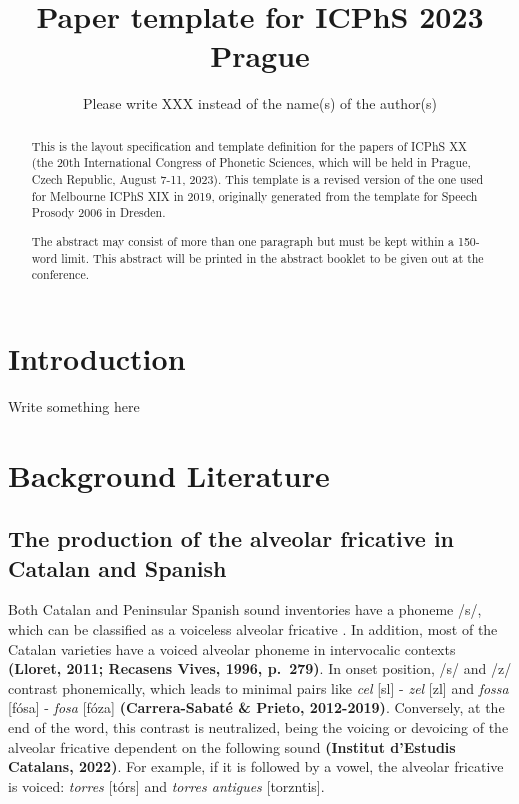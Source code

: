\documentclass[
  a4paper,
  11pt,
  twocolumn]{article}
\author{}
\date{\vspace{-2.5em}}
\begin{document}
\title{Paper template for {ICPhS} 2023 Prague}
\author{Please write XXX instead of the name(s) of the author(s)}


\maketitle

\begin{abstract}
This is the layout specification and template definition for the papers of ICPhS XX (the 20th International Congress of Phonetic Sciences, which will be held in Prague, Czech Republic, August 7-11, 2023). 
This template is a revised version of the one used for Melbourne ICPhS XIX in 2019, originally generated from the template for Speech Prosody 2006 in Dresden.

The abstract may consist of more than one paragraph but must be kept within a 150-word limit. 
This abstract will be printed in the abstract booklet to be given out at the conference.
\end{abstract}



\section{Introduction}

Write something here

\section{Background Literature}

\subsection{The production of the alveolar fricative in Catalan and Spanish}

Both Catalan and Peninsular Spanish sound inventories have a phoneme
/s/, which can be classified as a voiceless alveolar fricative
\cite{hualde_colina_2015}. In addition, most of the Catalan varieties
have a voiced alveolar phoneme in intervocalic contexts \textbf{(Lloret,
2011; Recasens Vives, 1996, p.~279)}. In onset position, /s/ and /z/
contrast phonemically, which leads to minimal pairs like \emph{cel}
{[}s\textepsilon l{]} - \emph{zel} {[}z\textepsilon l{]} and
\emph{fossa} {[}fósa{]} - \emph{fosa} {[}fóza{]} \textbf{(Carrera-Sabaté
\& Prieto, 2012-2019)}. Conversely, at the end of the word, this
contrast is neutralized, being the voicing or devoicing of the alveolar
fricative dependent on the following sound \textbf{(Institut d'Estudis
Catalans, 2022)}. For example, if it is followed by a vowel, the
alveolar fricative is voiced: \emph{torres} {[}tór\textschwa{}s{]} and
\emph{torres antigues}
{[}tor\textschwa{}z\textschwa{}nti\textgamma{}\textschwa{}s{]}.
\end{document}
